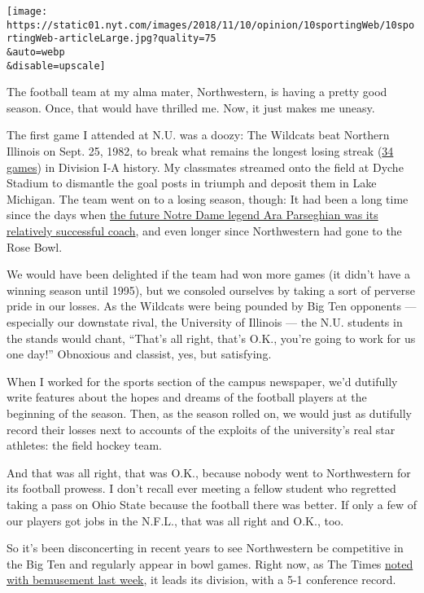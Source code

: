 \texttt{[image: https://static01.nyt.com/images/2018/11/10/opinion/10sportingWeb/10sportingWeb-articleLarge.jpg?quality=75\\\&auto=webp\\\&disable=upscale]}

The football team at my alma mater, Northwestern, is having a pretty
good season. Once, that would have thrilled me. Now, it just makes me
uneasy.

The first game I attended at N.U. was a doozy: The Wildcats beat
Northern Illinois on Sept. 25, 1982, to break what remains the longest
losing streak
(\href{http://www.espn.com/page2/s/list/colfootball/teams/worst.html}{34
games}) in Division I-A history. My classmates streamed onto the field
at Dyche Stadium to dismantle the goal posts in triumph and deposit them
in Lake Michigan. The team went on to a losing season, though: It had
been a long time since the days when
\href{http://exhibits.library.northwestern.edu/archives/exhibits/football/7.html}{the
future Notre Dame legend Ara Parseghian was its relatively successful
coach}, and even longer since Northwestern had gone to the Rose Bowl.

We would have been delighted if the team had won more games (it didn't
have a winning season until 1995), but we consoled ourselves by taking a
sort of perverse pride in our losses. As the Wildcats were being pounded
by Big Ten opponents --- especially our downstate rival, the University
of Illinois --- the N.U. students in the stands would chant, ``That's
all right, that's O.K., you're going to work for us one day!'' Obnoxious
and classist, yes, but satisfying.

When I worked for the sports section of the campus newspaper, we'd
dutifully write features about the hopes and dreams of the football
players at the beginning of the season. Then, as the season rolled on,
we would just as dutifully record their losses next to accounts of the
exploits of the university's real star athletes: the field hockey team.

And that was all right, that was O.K., because nobody went to
Northwestern for its football prowess. I don't recall ever meeting a
fellow student who regretted taking a pass on Ohio State because the
football there was better. If only a few of our players got jobs in the
N.F.L., that was all right and O.K., too.

So it's been disconcerting in recent years to see Northwestern be
competitive in the Big Ten and regularly appear in bowl games. Right
now, as The Times
\href{https://www.nytimes.com/2018/10/30/sports/college-football-playoff.html}{noted
with bemusement last week}, it leads its division, with a 5-1 conference
record.

